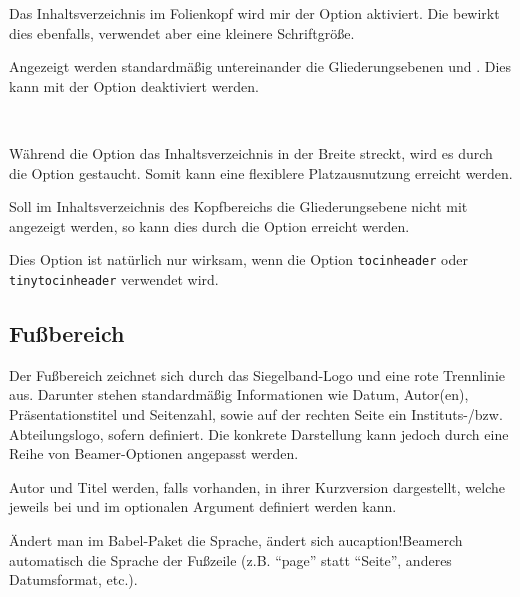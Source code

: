 Das Inhaltsverzeichnis im Folienkopf
wird mir der Option  aktiviert.
Die  bewirkt dies ebenfalls,
verwendet aber eine kleinere Schriftgröße.

Angezeigt werden standardmäßig untereinander die Gliederungsebenen
 und . Dies kann mit der Option
 deaktiviert werden.


\begin{Declaration}
  \\
\end{Declaration}

Während die Option  das Inhaltsverzeichnis in der Breite
streckt, wird es durch die Option  gestaucht.
Somit kann eine flexiblere Platzausnutzung erreicht werden.

\begin{Declaration}
\end{Declaration}

Soll im Inhaltsverzeichnis des Kopfbereichs die Gliederungsebene
 nicht mit angezeigt werden, so kann dies durch die Option
 erreicht werden.

Dies Option ist natürlich nur wirksam, wenn die Option
\lstinline{tocinheader} oder \lstinline{tinytocinheader} verwendet wird.



\subsection{Fußbereich}\label{subsec:foot}

Der Fußbereich zeichnet sich durch das Siegelband-Logo und eine rote Trennlinie
aus. Darunter stehen standardmäßig Informationen wie Datum, Autor(en), Präsentationstitel
und Seitenzahl, sowie auf der rechten Seite ein Instituts-/bzw. Abteilungslogo,
sofern definiert.
Die konkrete Darstellung kann jedoch durch eine Reihe von Beamer-Optionen angepasst werden.

Autor und Titel werden, falls vorhanden, in ihrer Kurzversion dargestellt,
welche jeweils bei  und  im optionalen Argument
definiert werden kann.

Ändert man im Babel-Paket die Sprache, ändert sich au{caption!Beamer}ch automatisch
die Sprache der Fußzeile (z.B. "`page"' statt "`Seite"', anderes Datumsformat, etc.).

